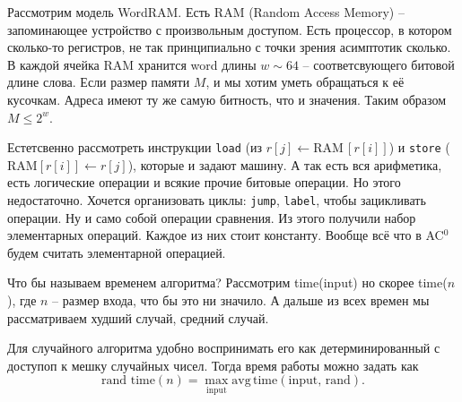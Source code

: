 Рассмотрим модель WordRAM. Есть RAM (Random Access Memory) -- запоминающее устройство с произвольным доступом. Есть процессор, в котором сколько-то регистров, не так принципиально с точки зрения асимптотик сколько. В каждой ячейка RAM хранится word длины $w \sim 64$ -- соответсвующего битовой длине слова. Если размер памяти $M$, и мы хотим уметь обращаться к её кусочкам. Адреса имеют ту же самую битность, что и значения. Таким образом $M \leq 2^w$. 

Естетсвенно рассмотреть инструкции \texttt{load} (из $r[j] \leftarrow \text{RAM}\,[r[i]]$) и \texttt{store} ($\text{RAM}[r[i]] \leftarrow r[j]$), которые и задают машину. А так есть вся арифметика, есть логические операции и всякие прочие битовые операции. Но этого недостаточно. Хочется организовать циклы: \texttt{jump}, \texttt{label}, чтобы зацикливать операции. Ну и само собой операции сравнения. Из этого получили набор элементарных операций. Каждое из них стоит константу. Вообще всё что в AC$^0$ будем считать элементарной операцией. 


Что бы называем временем алгоритма? Рассмотрим time(input) но скорее time($n$), где $n$ -- размер входа, что бы это ни значило. А дальше из всех времен мы рассматриваем худший случай, средний случай.  

Для случайного алгоритма удобно воспринимать его как детерминированный с доступоп к мешку случайных чисел. Тогда время работы можно задать как
\begin{equation*}
	\text{rand time}(n) = \max_{\text{input}} \text{avg}\, \text{time} (\text{input},\, \text{rand}).
\end{equation*}






